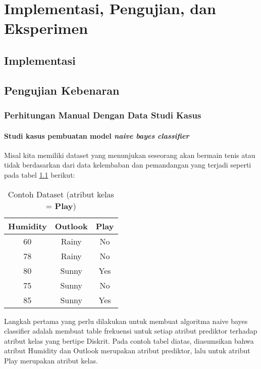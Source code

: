 \chapter{Implementasi, Pengujian, dan Eksperimen}

\section{Implementasi}


\section{Pengujian Kebenaran}

\subsection{Perhitungan Manual Dengan Data Studi Kasus}

\subsubsection{Studi kasus pembuatan model \textit{naive bayes classifier}}
Misal kita memiliki dataset yang menunjukan seseorang akan bermain tenis atau tidak berdasarkan dari data kelembaban dan pemandangan yang terjadi seperti pada tabel \ref{tab:dataset} berikut: 
		
		\begin{table}[H]
		\label{tab:dataset}
		\centering
		\caption{Contoh Dataset (atribut kelas = \textbf{Play})}
		\begin{tabular}{ | c | c | c | }
		\hline
		 Humidity & Outlook & \textbf{Play}\\ \hline \hline
		60 & Rainy & No\\ \hline
		78 & Rainy & No\\ \hline
		80 & Sunny & Yes\\ \hline
		75 & Sunny & No\\ \hline
		85 & Sunny & Yes \\ \hline
		\end{tabular}
		\end{table}
		
		
		Langkah pertama yang perlu dilakukan untuk membuat algoritma naive bayes classifier adalah membuat table frekuensi untuk setiap atribut prediktor terhadap atribut kelas yang bertipe Diskrit. Pada contoh tabel diatas, diasumsikan bahwa atribut Humidity dan Outlook merupakan atribut prediktor, lalu untuk atribut Play merupakan atribut kelas.
		
